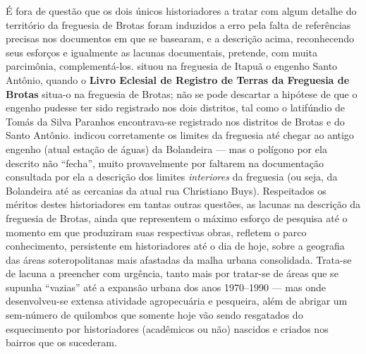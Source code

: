 É fora de questão que os dois únicos historiadores a tratar com algum detalhe do território da freguesia de Brotas \cite{NASCIMENTO2007,ott_engenhos_1996} foram induzidos a erro pela falta de referências precisas nos documentos em que se basearam, e a descrição acima, reconhecendo seus esforços e igualmente as lacunas documentais, pretende, com muita parcimônia, complementá-los.  situou na freguesia de Itapuã o engenho Santo Antônio, quando o \textbf{Livro Eclesial de Registro de Terras da Freguesia de Brotas} situa-o na freguesia de Brotas; não se pode descartar a hipótese de que o engenho pudesse ter sido registrado nos dois distritos, tal como o latifúndio de Tomás da Silva Paranhos encontrava-se registrado nos distritos de Brotas e do Santo Antônio.  indicou corretamente os limites da freguesia até chegar ao antigo engenho (atual estação de águas) da Bolandeira --- mas o polígono por ela descrito não ``fecha'', muito provavelmente por faltarem na documentação consultada por ela a descrição dos limites \textit{interiores} da freguesia (ou seja, da Bolandeira até as cercanias da atual rua Christiano Buys). Respeitados os méritos destes historiadores em tantas outras questões, as lacunas na descrição da freguesia de Brotas, ainda que representem o máximo esforço de pesquisa até o momento em que produziram suas respectivas obras, refletem o parco conhecimento, persistente em historiadores até o dia de hoje, sobre a geografia das áreas soteropolitanas mais afastadas da malha urbana consolidada. Trata-se de lacuna a preencher com urgência, tanto mais por tratar-se de áreas que se supunha ``vazias'' até a expansão urbana dos anos 1970--1990 --- mas onde desenvolveu-se extensa atividade agropecuária e pesqueira, além de abrigar um sem-número de quilombos que somente hoje vão sendo resgatados do esquecimento por historiadores (acadêmicos ou não) nascidos e criados nos bairros que os sucederam.

